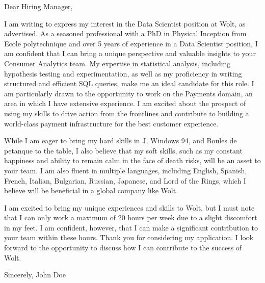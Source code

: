 \documentclass[a4paper,10pt]{letter}
\begin{document}
\begin{letter}{}
\opening{ Dear Hiring Manager, }

I am writing to express my interest in the Data Scientist position at Wolt, as advertised. As a seasoned professional with a PhD in Physical Inception from Ecole polytechnique and over 5 years of experience in a Data Scientist position, I am confident that I can bring a unique perspective and valuable insights to your Consumer Analytics team. My expertise in statistical analysis, including hypothesis testing and experimentation, as well as my proficiency in writing structured and efficient SQL queries, make me an ideal candidate for this role. I am particularly drawn to the opportunity to work on the Payments domain, an area in which I have extensive experience. I am excited about the prospect of using my skills to drive action from the frontlines and contribute to building a world-class payment infrastructure for the best customer experience.

While I am eager to bring my hard skills in J, Windows 94, and Boules de petanque to the table, I also believe that my soft skills, such as my constant happiness and ability to remain calm in the face of death risks, will be an asset to your team. I am also fluent in multiple languages, including English, Spanish, French, Italian, Bulgarian, Russian, Japanese, and Lord of the Rings, which I believe will be beneficial in a global company like Wolt.

I am excited to bring my unique experiences and skills to Wolt, but I must note that I can only work a maximum of 20 hours per week due to a slight discomfort in my feet. I am confident, however, that I can make a significant contribution to your team within these hours. Thank you for considering my application. I look forward to the opportunity to discuss how I can contribute to the success of Wolt.

\closing{ Sincerely, John Doe }

\end{letter}
\end{document}
